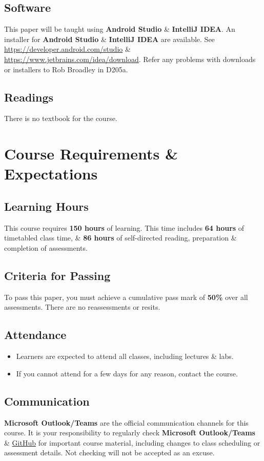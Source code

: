 \documentclass{article}
\begin{document}
\subsection*{Software}
This paper will be taught using \textbf{Android Studio} \& \textbf{IntelliJ IDEA}. An installer for \textbf{Android Studio} \& \textbf{IntelliJ IDEA} are available. See \href{https://developer.android.com/studio/}{https://developer.android.com/studio} \& \href{https://www.jetbrains.com/idea/download/}{https://www.jetbrains.com/idea/download}. Refer any problems with downloads or installers to Rob Broadley in D205a.

\subsection*{Readings}
There is no textbook for the course.

\section*{Course Requirements \& Expectations}

\subsection*{Learning Hours}
This course requires \textbf{150 hours} of learning. This time includes \textbf{64 hours} of timetabled class time, \& \textbf{86 hours} of self-directed reading, preparation \& completion of assessments.

\subsection*{Criteria for Passing}
To pass this paper, you must achieve a cumulative pass mark of \textbf{50\%} over all assessments. There are no reassessments or resits.

\subsection*{Attendance}
\begin{itemize}
	\item Learners are expected to attend all classes, including lectures \& labs.
	\item If you cannot attend for a few days for any reason, contact the course.
\end{itemize}

\subsection*{Communication}
\textbf{Microsoft Outlook/Teams} are the official communication channels for this course. It is your responsibility to regularly check \textbf{Microsoft Outlook/Teams} \& \href{https://github.com/otago-polytechnic-bit-courses/IN721-mobile-application-development}{GitHub} for important course material, including changes to class scheduling or assessment details. Not checking will not be accepted as an excuse.
\end{document}
